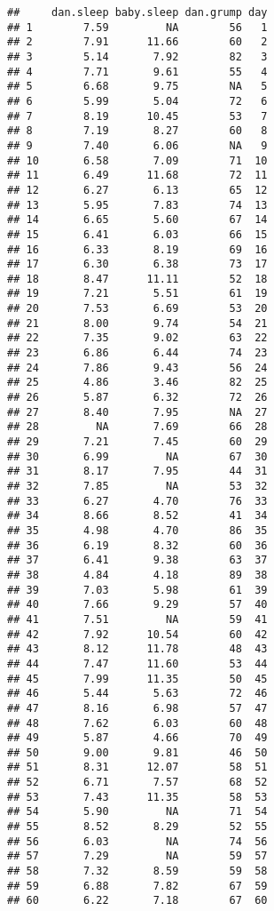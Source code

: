 \documentclass[
]{article}
\begin{document}
\begin{verbatim}
##     dan.sleep baby.sleep dan.grump day
## 1        7.59         NA        56   1
## 2        7.91      11.66        60   2
## 3        5.14       7.92        82   3
## 4        7.71       9.61        55   4
## 5        6.68       9.75        NA   5
## 6        5.99       5.04        72   6
## 7        8.19      10.45        53   7
## 8        7.19       8.27        60   8
## 9        7.40       6.06        NA   9
## 10       6.58       7.09        71  10
## 11       6.49      11.68        72  11
## 12       6.27       6.13        65  12
## 13       5.95       7.83        74  13
## 14       6.65       5.60        67  14
## 15       6.41       6.03        66  15
## 16       6.33       8.19        69  16
## 17       6.30       6.38        73  17
## 18       8.47      11.11        52  18
## 19       7.21       5.51        61  19
## 20       7.53       6.69        53  20
## 21       8.00       9.74        54  21
## 22       7.35       9.02        63  22
## 23       6.86       6.44        74  23
## 24       7.86       9.43        56  24
## 25       4.86       3.46        82  25
## 26       5.87       6.32        72  26
## 27       8.40       7.95        NA  27
## 28         NA       7.69        66  28
## 29       7.21       7.45        60  29
## 30       6.99         NA        67  30
## 31       8.17       7.95        44  31
## 32       7.85         NA        53  32
## 33       6.27       4.70        76  33
## 34       8.66       8.52        41  34
## 35       4.98       4.70        86  35
## 36       6.19       8.32        60  36
## 37       6.41       9.38        63  37
## 38       4.84       4.18        89  38
## 39       7.03       5.98        61  39
## 40       7.66       9.29        57  40
## 41       7.51         NA        59  41
## 42       7.92      10.54        60  42
## 43       8.12      11.78        48  43
## 44       7.47      11.60        53  44
## 45       7.99      11.35        50  45
## 46       5.44       5.63        72  46
## 47       8.16       6.98        57  47
## 48       7.62       6.03        60  48
## 49       5.87       4.66        70  49
## 50       9.00       9.81        46  50
## 51       8.31      12.07        58  51
## 52       6.71       7.57        68  52
## 53       7.43      11.35        58  53
## 54       5.90         NA        71  54
## 55       8.52       8.29        52  55
## 56       6.03         NA        74  56
## 57       7.29         NA        59  57
## 58       7.32       8.59        59  58
## 59       6.88       7.82        67  59
## 60       6.22       7.18        67  60

\end{verbatim}
\end{document}
